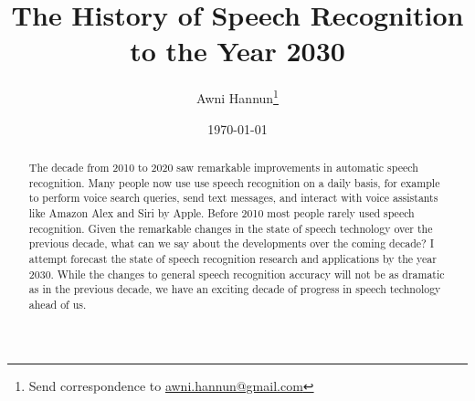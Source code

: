 \documentclass[twocolumn, 12pt]{article}
\title{The History of Speech Recognition to the Year 2030}
\author{Awni Hannun\footnote{
  Send correspondence to
  \href{mailto:awni.hannun@gmail.com}{awni.hannun@gmail.com}}}
\date{\today}
\begin{document}
\maketitle

\begin{abstract}
    The decade from 2010 to 2020 saw remarkable improvements in automatic
    speech recognition. Many people now use use speech recognition on a daily
    basis, for example to perform voice search queries, send text messages, and
    interact with voice assistants like Amazon Alex and Siri by Apple. Before
    2010 most people rarely used speech recognition. Given the remarkable
    changes in the state of speech technology over the previous decade, what
    can we say about the developments over the coming decade? I attempt
    forecast the state of speech recognition research and applications by the
    year 2030. While the changes to general speech recognition accuracy will
    not be as dramatic as in the previous decade, we have an exciting decade of
    progress in speech technology ahead of us.
\end{abstract}









\end{document}
